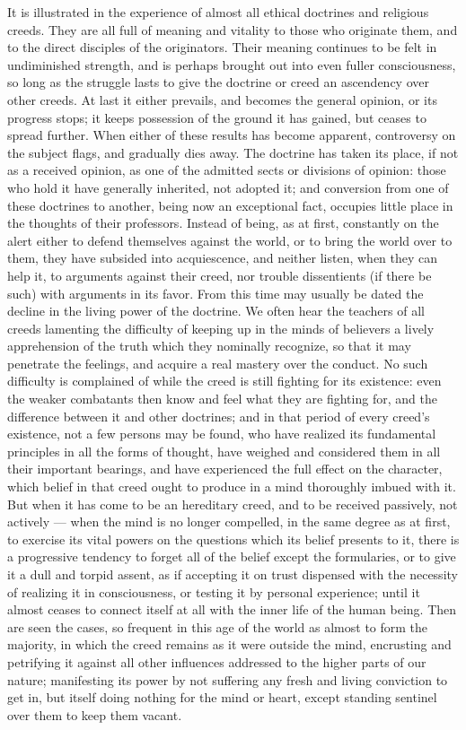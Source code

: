 \documentclass[12pt]{report}
\begin{document}
It is illustrated in the experience of almost all ethical doctrines and religious creeds. They are all full of meaning and vitality to those who originate them, and to the direct disciples of the originators. Their meaning continues to be felt in undiminished strength, and is perhaps brought out into even fuller consciousness, so long as the struggle lasts to give the doctrine or creed an ascendency over other creeds. At last it either prevails, and becomes the general opinion, or its progress stops; it keeps possession of the ground it has gained, but ceases to spread further. When either of these results has become apparent, controversy on the subject flags, and gradually dies away. The doctrine has taken its place, if not as a received opinion, as one of the admitted sects or divisions of opinion: those who hold it have generally inherited, not adopted it; and conversion from one of these doctrines to another, being now an exceptional fact, occupies little place in the thoughts of their professors. Instead of being, as at first, constantly on the alert either to defend themselves against the world, or to bring the world over to them, they have subsided into acquiescence, and neither listen, when they can help it, to arguments against their creed, nor trouble dissentients (if there be such) with arguments in its favor. From this time may usually be dated the decline in the living power of the doctrine. We often hear the teachers of all creeds lamenting the difficulty of keeping up in the minds of believers a lively apprehension of the truth which they nominally recognize, so that it may penetrate the feelings, and acquire a real mastery over the conduct. No such difficulty is complained of while the creed is still fighting for its existence: even the weaker combatants then know and feel what they are fighting for, and the difference between it and other doctrines; and in that period of every creed's existence, not a few persons may be found, who have realized its fundamental principles in all the forms of thought, have weighed and considered them in all their important bearings, and have experienced the full effect on the character, which belief in that creed ought to produce in a mind thoroughly imbued with it. But when it has come to be an hereditary creed, and to be received passively, not actively — when the mind is no longer compelled, in the same degree as at first, to exercise its vital powers on the questions which its belief presents to it, there is a progressive tendency to forget all of the belief except the formularies, or to give it a dull and torpid assent, as if accepting it on trust dispensed with the necessity of realizing it in consciousness, or testing it by personal experience; until it almost ceases to connect itself at all with the inner life of the human being. Then are seen the cases, so frequent in this age of the world as almost to form the majority, in which the creed remains as it were outside the mind, encrusting and petrifying it against all other influences addressed to the higher parts of our nature; manifesting its power by not suffering any fresh and living conviction to get in, but itself doing nothing for the mind or heart, except standing sentinel over them to keep them vacant.
\end{document}
